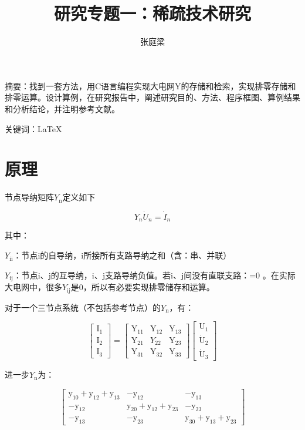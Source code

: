 \documentclass{ctexart} %
\title{研究专题一：稀疏技术研究}
\author{张庭梁}
\begin{document}
\maketitle

摘要：找到一套方法，用C语言编程实现大电网Y的存储和检索，实现排零存储和排零运算。设计算例，在研究报告中，阐述研究目的、方法、程序框图、算例结果和分析结论，并注明参考文献。


关键词：\LaTeX



\section{原理}
节点导纳矩阵$Y_{\mathrm{n}}$定义如下

\begin{equation}
Y_{n} \dot{U}_{n}=\dot{I}_{n}
\end{equation}

其中：

$Y_{\mathrm{ii}}$：节点i的自导纳，i所接所有支路导纳之和（含：串、并联）

$Y_{\mathrm{ij}}$：节点i、j的互导纳，i、j支路导纳负值。若i、j间没有直联支路：=0 。在实际大电网中，很多$Y_{\mathrm{ij}}$是0，所以有必要实现排零储存和运算。

对于一个三节点系统（不包括参考节点）的$Y_{\mathrm{n}}$，有：

\begin{equation}
\left[ \begin{array}{l}{\mathrm{I}_{1}} \\ {\mathrm{I}_{2}} \\ {\mathrm{I}_{3}}\end{array}\right]=\left[ \begin{array}{lll}{\mathrm{Y}_{11}} & {\mathrm{Y}_{12}} & {\mathrm{Y}_{13}} \\ {\mathrm{Y}_{21}} & {Y_{22}} & {\mathrm{Y}_{23}} \\ {\mathrm{Y}_{31}} & {\mathrm{Y}_{32}} & {\mathrm{Y}_{33}}\end{array}\right] \left[ \begin{array}{l}{\mathrm{U}_{1}} \\ {\dot{\mathrm{U}}_{2}} \\ {\dot{\mathrm{U}}_{3}}\end{array}\right]
\end{equation}

进一步$Y_{\mathrm{n}}$为：

\begin{equation}
\left[ \begin{array}{ccc}{\mathrm{y}_{10}+\mathrm{y}_{12}+\mathrm{y}_{13}} & {-\mathrm{y}_{12}} & {-\mathrm{y}_{13}} \\ {-\mathrm{y}_{12}} & {\mathrm{y}_{20}+\mathrm{y}_{12}+\mathrm{y}_{23}} & {-\mathrm{y}_{23}} \\ {\mathrm{-y}_{13}} & {-\mathrm{y}_{23}} & {\mathrm{y}_{30}+\mathrm{y}_{13}+\mathrm{y}_{23}}\end{array}\right]
\end{equation}
\end{document}
